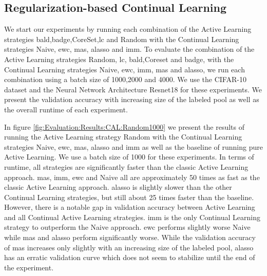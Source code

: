 \subsection{Regularization-based Continual Learning}
\label{sec:Evaluation:Results:CAL:ALRegCL}
We start our experiments by running each combination of the Active Learning strategies \gls{bald},\gls{badge},CoreSet,\gls{lc} and Random with the Continual Learning
strategies Naive, \gls{ewc}, \gls{mas}, \gls{alasso} and \gls{imm}.
To evaluate the combination of the Active Learning strategies Random, \gls{lc}, \gls{bald},Coreset and \gls{badge}, with the Continual Learning strategies Naive,
\gls{ewc}, \gls{imm}, \gls{mas} and \gls{alasso}, we run each combination using a batch size of 1000,2000 and 4000. We use the CIFAR-10 dataset and the Neural Network
Architecture Resnet18 for these experiments. We present the validation accuracy with increasing
size of the labeled pool as well as the overall runtime of each experiment. \par
In figure \ref{fig:Evaluation:Results:CAL:Random1000} we present the results of running the Active Learning strategy Random with the Continual Learning strategies Naive, \gls{ewc}, \gls{mas}, \gls{alasso} and \gls{imm}
as well as the baseline of running pure Active Learning. We use a batch size of 1000 for these experiments. In terms of runtime, all strategies are significantly faster than the classic Active
Learning approach. \gls{mas}, \gls{imm}, \gls{ewc} and Naive all are approximately 50 times as fast as the classic Active Learning approach. \gls{alasso} is slightly slower than the other Continual Learning strategies,
but still about 25 times faster than the baseline. However, there is a notable gap in validation accuracy between Active Learning and all Continual Active Learning strategies. \gls{imm} is the only
Continual Learning strategy to outperform the Naive approach. \gls{ewc} performs slightly worse Naive while \gls{mas} and \gls{alasso} perform significantly worse. While the validation accuracy of \gls{mas} increases only
slightly with an increasing size of the labeled pool, \gls{alasso} has an erratic validation curve which does not seem to stabilize until the end of the experiment. \par

